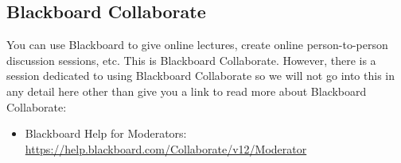 \subsection{Blackboard Collaborate}

You can use Blackboard to give online lectures, create online person-to-person discussion sessions, etc. This is Blackboard Collaborate. However, there is a session dedicated to using Blackboard Collaborate so we will not go into this in any detail here other than give you a link to read more about Blackboard Collaborate:

	\begin{itemize}
	\item Blackboard Help for Moderators: \url{https://help.blackboard.com/Collaborate/v12/Moderator}
	\end{itemize}












